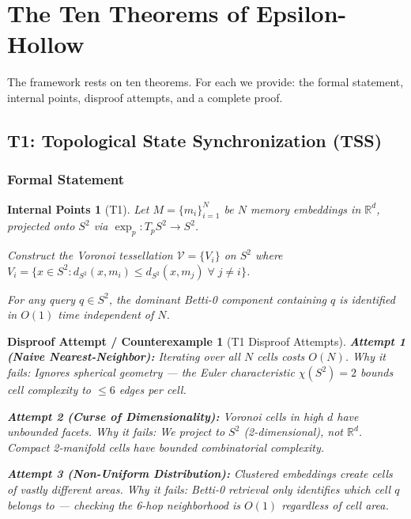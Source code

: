 \documentclass[11pt, a4paper]{article}
\theoremstyle{proofform}
\newtheorem{innerpoints}{Internal Points}
\numberwithin{innerpoints}{subsection}
\newtheorem{disproof}{Disproof Attempt / Counterexample}
\numberwithin{disproof}{subsection}
\theoremstyle{mathproof}
\begin{document}
\section{The Ten Theorems of Epsilon-Hollow}
\label{sec:theorems}

The framework rests on ten theorems. For each we provide: the formal statement, internal points, disproof attempts, and a complete proof.

\subsection{T1: Topological State Synchronization (TSS)}
\label{sec:tss}

\subsubsection*{Formal Statement}
\begin{innerpoints}[T1]
\item Let $M = \{m_i\}_{i=1}^N$ be $N$ memory embeddings in $\mathbb{R}^d$, projected onto $S^2$ via $\exp_p: T_p S^2 \to S^2$.
\item Construct the Voronoi tessellation $\mathcal{V} = \{V_i\}$ on $S^2$ where
  $V_i = \{x \in S^2 : d_{S^2}(x, m_i) \leq d_{S^2}(x, m_j) \;\forall\; j \neq i\}$.
\item For any query $q \in S^2$, the dominant Betti-0 component containing $q$ is identified in $O(1)$ time independent of $N$.
\end{innerpoints}

\begin{disproof}[T1 Disproof Attempts]
\textbf{Attempt 1 (Naive Nearest-Neighbor):} Iterating over all $N$ cells costs $O(N)$. \textit{Why it fails:} Ignores spherical geometry --- the Euler characteristic $\chi(S^2) = 2$ bounds cell complexity to $\leq 6$ edges per cell.

\textbf{Attempt 2 (Curse of Dimensionality):} Voronoi cells in high $d$ have unbounded facets. \textit{Why it fails:} We project to $S^2$ (2-dimensional), not $\mathbb{R}^d$. Compact 2-manifold cells have bounded combinatorial complexity.

\textbf{Attempt 3 (Non-Uniform Distribution):} Clustered embeddings create cells of vastly different areas. \textit{Why it fails:} Betti-0 retrieval only identifies which cell $q$ belongs to --- checking the 6-hop neighborhood is $O(1)$ regardless of cell area.
\end{disproof}
\end{document}
